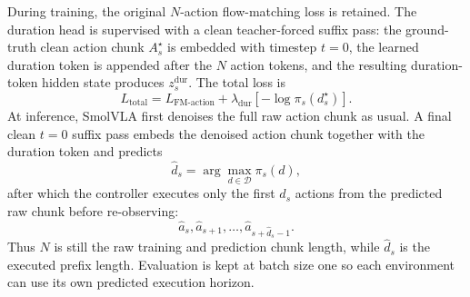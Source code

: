 \documentclass[10pt,twocolumn,letterpaper]{article}
\begin{document}
During training, the original $N$-action flow-matching loss is retained. The duration head is supervised with a clean teacher-forced suffix pass: the ground-truth clean action chunk $A_s^\star$ is embedded with timestep $t=0$, the learned duration token is appended after the $N$ action tokens, and the resulting duration-token hidden state produces $z_s^{\mathrm{dur}}$. The total loss is
\begin{equation}
L_{\mathrm{total}} = L_{\text{FM-action}}
+ \lambda_{\mathrm{dur}}\left[-\log \pi_s(d_s^{\star})\right].
\label{eq:prelim-duration-loss}
\end{equation}
At inference, SmolVLA first denoises the full raw action chunk as usual. A final clean $t=0$ suffix pass embeds the denoised action chunk together with the duration token and predicts
\begin{equation}
\hat d_s = \arg\max_{d\in\mathcal{D}}\pi_s(d),
\end{equation}
after which the controller executes only the first $\hat d_s$ actions from the predicted raw chunk before re-observing:
\begin{equation}
\hat a_s,\hat a_{s+1},\ldots,\hat a_{s+\hat d_s-1}.
\end{equation}
Thus $N$ is still the raw training and prediction chunk length, while $\hat d_s$ is the executed prefix length. Evaluation is kept at batch size one so each environment can use its own predicted execution horizon.
\end{document}
